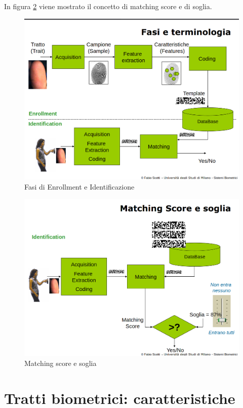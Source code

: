 In figura \ref{fig:matching-score} viene mostrato il concetto di matching score e di soglia.

\begin{figure}
    \centering
    \includegraphics[width=0.95\linewidth]{chapters/images-chap1/enrollment-identification.png}
    \caption{Fasi di Enrollment e Identificazione}
    \label{fig:enroll-ident}
\end{figure}

\begin{figure}
    \centering
    \includegraphics[width=0.95\linewidth]{chapters/images-chap1/matching-score.png}
    \caption{Matching score e soglia}
    \label{fig:matching-score}
\end{figure}

\newpage

\section{Tratti biometrici: caratteristiche}

